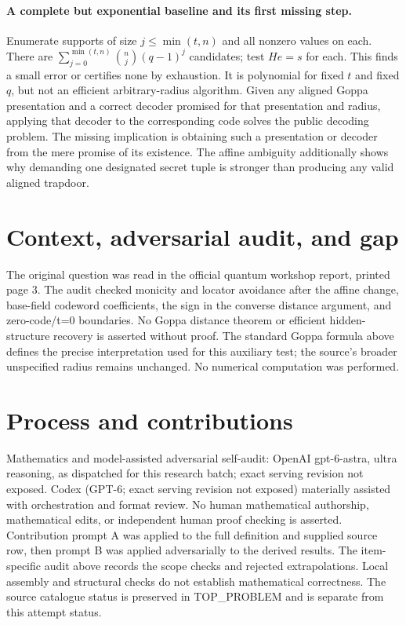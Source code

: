 \documentclass[11pt]{article}
\begin{document}
\paragraph{A complete but exponential baseline and its first missing step.}
Enumerate supports of size $j\le\min(t,n)$ and all nonzero values on each.
There are
$\sum_{j=0}^{\min(t,n)}\binom nj(q-1)^j$ candidates; test $He=s$ for each.
This finds a small error or certifies none by exhaustion. It is polynomial
for fixed $t$ and fixed $q$, but not an efficient arbitrary-radius algorithm.
Given any aligned Goppa presentation and a correct decoder promised for that
presentation and radius, applying that decoder to the corresponding code
solves the public decoding problem. The missing implication is obtaining such
a presentation or decoder from the mere promise of its existence. The affine
ambiguity additionally shows why demanding one designated secret tuple is
stronger than producing any valid aligned trapdoor.

\section{Context, adversarial audit, and gap}
The original question was read in the official quantum workshop report,
printed page 3. The audit checked monicity and locator avoidance after the
affine change, base-field codeword coefficients, the sign in the converse
distance argument, and zero-code/t=0 boundaries. No Goppa distance theorem
or efficient hidden-structure recovery is asserted without proof. The standard
Goppa formula above defines the precise interpretation used for this auxiliary
test; the source's broader unspecified radius remains unchanged. No numerical
computation was performed.

\section{Process and contributions}
Mathematics and model-assisted adversarial self-audit: OpenAI gpt-6-astra, ultra reasoning, as dispatched for this research batch; exact serving revision not exposed. Codex (GPT-6; exact serving revision not exposed) materially assisted with orchestration and format review. No human mathematical authorship, mathematical edits, or independent human proof checking is asserted.
Contribution prompt A was applied to the full definition and supplied source row, then prompt B was applied adversarially to the derived results. The item-specific audit above records the scope checks and rejected extrapolations. Local assembly and structural checks do not establish mathematical correctness. The source catalogue status is preserved in TOP\_PROBLEM and is separate from this attempt status.
\end{document}
